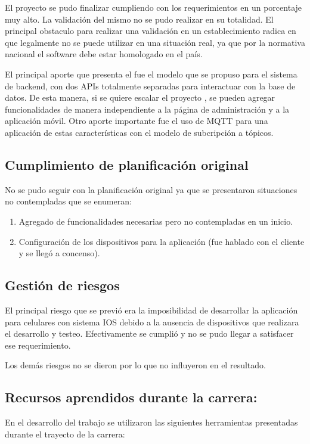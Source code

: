 El proyecto se pudo finalizar cumpliendo con los requerimientos en un porcentaje muy alto. La validación del mismo no se pudo realizar en su totalidad. El principal obstaculo para realizar una validación en un establecimiento radica en que legalmente no se puede utilizar en una situación real, ya que por la normativa nacional el software debe estar homologado en el país.  


El principal aporte que presenta el fue el modelo que se propuso para el sistema de backend, con dos APIs totalmente separadas para interactuar con la base de datos. De esta manera, si se quiere escalar el proyecto , se pueden agregar funcionalidades de manera independiente a la página de administración y a la aplicación móvil. Otro aporte importante fue el uso de MQTT para una aplicación de estas características con el modelo de subcripción a tópicos.




\subsection{Cumplimiento de planificación original}

No se pudo seguir con la planificación original ya que se presentaron situaciones no contempladas que se enumeran:
\begin{enumerate}
\item Agregado de funcionalidades necesarias pero no contempladas en un inicio.
\item Configuración de los dispositivos para la aplicación (fue hablado con el cliente y se llegó a concenso).

\end{enumerate}


\subsection{Gestión de riesgos}

El principal riesgo que se previó era la imposibilidad de desarrollar la aplicación para celulares con sistema IOS debido a la ausencia de dispositivos que realizara el desarrollo y testeo. Efectivamente se cumplió y no se pudo llegar a satisfacer ese requerimiento.

Los demás riesgos no se dieron por lo que no influyeron en el resultado.

\subsection{Recursos aprendidos durante la carrera:}
En el desarrollo del trabajo se utilizaron las siguientes herramientas presentadas durante el trayecto de la carrera:

